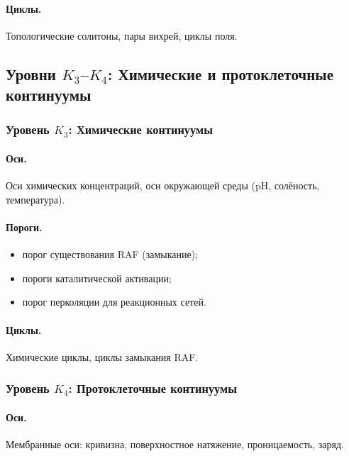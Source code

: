 \paragraph{Циклы.}
Топологические солитоны, пары вихрей, циклы поля.


\subsection{Уровни \texorpdfstring{\texorpdfstring{$K_3$}{K\_3}–\texorpdfstring{$K_4$}{K\_4}}{K3–K4}: Химические и протоклеточные континуумы}

\subsubsection{Уровень \texorpdfstring{\(K_3\)}{K3}: Химические континуумы}

\paragraph{Оси.}
Оси химических концентраций, оси окружающей среды (pH, солёность, температура).

\paragraph{Пороги.}
\begin{itemize}
    \item порог существования RAF (замыкание);
    \item пороги каталитической активации;
    \item порог перколяции для реакционных сетей.
\end{itemize}

\paragraph{Циклы.}
Химические циклы, циклы замыкания RAF.

\subsubsection{Уровень \texorpdfstring{\(K_4\)}{K4}: Протоклеточные континуумы}

\paragraph{Оси.}
Мембранные оси: кривизна, поверхностное натяжение, проницаемость, заряд.

